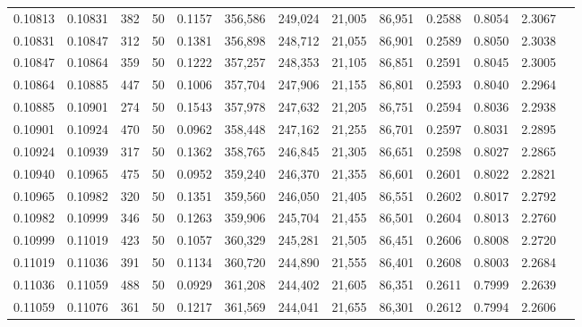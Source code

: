 \begin{tabular}{rrrrrrrrrrrrr}
0.10813 & 0.10831 &   382 &  50 &                                     0.1157 & 356,586 & 249,024 &  21,005 &  86,951 & 0.2588 & 0.8054 & 2.3067 \\
0.10831 & 0.10847 &   312 &  50 &                                     0.1381 & 356,898 & 248,712 &  21,055 &  86,901 & 0.2589 & 0.8050 & 2.3038 \\
0.10847 & 0.10864 &   359 &  50 &                                     0.1222 & 357,257 & 248,353 &  21,105 &  86,851 & 0.2591 & 0.8045 & 2.3005 \\
0.10864 & 0.10885 &   447 &  50 &                                     0.1006 & 357,704 & 247,906 &  21,155 &  86,801 & 0.2593 & 0.8040 & 2.2964 \\
0.10885 & 0.10901 &   274 &  50 &                                     0.1543 & 357,978 & 247,632 &  21,205 &  86,751 & 0.2594 & 0.8036 & 2.2938 \\
0.10901 & 0.10924 &   470 &  50 &                                     0.0962 & 358,448 & 247,162 &  21,255 &  86,701 & 0.2597 & 0.8031 & 2.2895 \\
0.10924 & 0.10939 &   317 &  50 &                                     0.1362 & 358,765 & 246,845 &  21,305 &  86,651 & 0.2598 & 0.8027 & 2.2865 \\
0.10940 & 0.10965 &   475 &  50 &                                     0.0952 & 359,240 & 246,370 &  21,355 &  86,601 & 0.2601 & 0.8022 & 2.2821 \\
0.10965 & 0.10982 &   320 &  50 &                                     0.1351 & 359,560 & 246,050 &  21,405 &  86,551 & 0.2602 & 0.8017 & 2.2792 \\
0.10982 & 0.10999 &   346 &  50 &                                     0.1263 & 359,906 & 245,704 &  21,455 &  86,501 & 0.2604 & 0.8013 & 2.2760 \\
0.10999 & 0.11019 &   423 &  50 &                                     0.1057 & 360,329 & 245,281 &  21,505 &  86,451 & 0.2606 & 0.8008 & 2.2720 \\
0.11019 & 0.11036 &   391 &  50 &                                     0.1134 & 360,720 & 244,890 &  21,555 &  86,401 & 0.2608 & 0.8003 & 2.2684 \\
0.11036 & 0.11059 &   488 &  50 &                                     0.0929 & 361,208 & 244,402 &  21,605 &  86,351 & 0.2611 & 0.7999 & 2.2639 \\
0.11059 & 0.11076 &   361 &  50 &                                     0.1217 & 361,569 & 244,041 &  21,655 &  86,301 & 0.2612 & 0.7994 & 2.2606 \\

\end{tabular}
